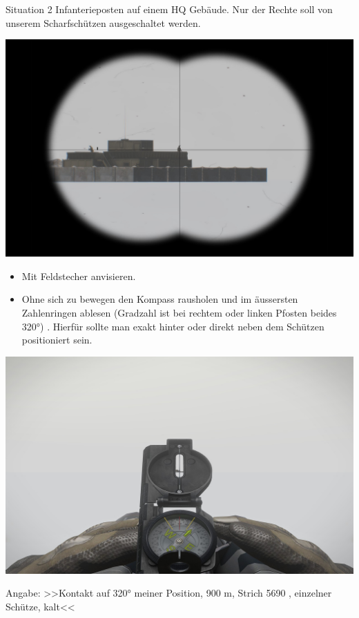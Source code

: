 	Situation 2 Infanterieposten auf einem HQ Gebäude. Nur der Rechte soll von unserem Scharfschützen ausgeschaltet werden.  \\
\begin{minipage}[t]{1\textwidth}
	\includegraphics[width=\textwidth]{./Grafiken/KarteUndMarkierungen/Kompass5.jpg}
\end{minipage}

		\begin{itemize}
 			\item Mit Feldstecher anvisieren.
			\item Ohne sich zu bewegen den Kompass rausholen und im äussersten Zahlenringen ablesen (Gradzahl ist bei rechtem oder linken Pfosten beides 320°) . Hierfür sollte man exakt hinter oder direkt neben dem Schützen positioniert sein.
		\end{itemize}

\begin{minipage}[t]{1\textwidth}
	\includegraphics[width=\textwidth]{./Grafiken/KarteUndMarkierungen/Kompass6.jpg}
\end{minipage}
Angabe: >>Kontakt auf 320° meiner Position, 900 m, Strich 5690 , einzelner Schütze, kalt<<